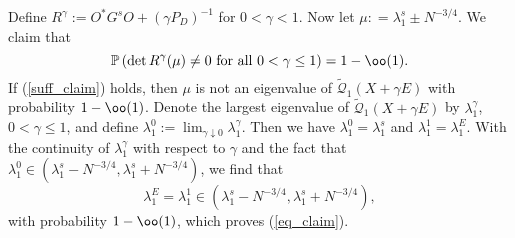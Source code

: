 Define $R^\gamma:=O^* G^s O + (\gamma P_D)^{-1}$ for $0<\gamma < 1$. Now let $\mu: = \lambda_1^s \pm N^{-3/4}.$ We claim that 
\begin{equation}\label{suff_claim}
{\mathbb P\left(\det R^\gamma (\mu) \ne 0 \text{ for all }0< \gamma \le 1\right) = 1-\oo(1).}
\end{equation}
If (\ref{suff_claim}) holds, then $\mu$ is not an eigenvalue of $\tilde{\mathcal Q}_1(X+\gamma E)$ with probability $1-\oo(1)$. Denote the largest eigenvalue of $\tilde{\mathcal Q}_1(X+\gamma E)$ by $\lambda^\gamma_1$, $0<\gamma \leq 1$, and define $\lambda^{0}_1:=\lim_{\gamma\downarrow 0}\lambda_1^\gamma$. Then we have $\lambda^0_1= \lambda_1^s $ and $\lambda^1_1= \lambda_1^E$. With the continuity of $\lambda_1^\gamma$ with respect to $\gamma$ and the fact that $\lambda^0_1\in (\lambda_1^s -N^{-3/4},\lambda_1^s +N^{-3/4})$, we find that
$$ \lambda_1^E = \lambda^1_1 \in (\lambda_1^s-N^{-3/4},\lambda_1^s+N^{-3/4}),$$
with probability $1-\oo(1)$, which proves (\ref{eq_claim}).



